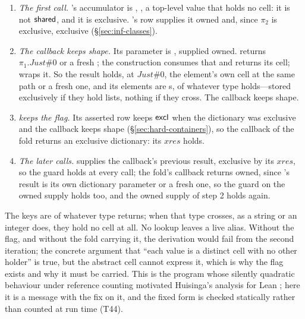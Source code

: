 \begin{enumerate}
\item \emph{The first call.} 's accumulator is , , a top-level value that holds no cell: it is not $\mathsf{shared}$, and it is exclusive.
's row supplies it owned and, since $\pi_2$ is exclusive, exclusive (\S\ref{sec:inf-classes}).
\item \emph{The callback keeps shape.} Its parameter is , supplied owned.
 returns $\pi_1.\mathit{Just}\#0$ or a fresh \code{[]}; the construction
\code{[ …⋯, x ]} consumes that and returns its cell;  wraps it. So the result holds, at
$\mathit{Just}\#0$, the element's own cell at the same path or a fresh one, and its elements are s, of
whatever type  holds---stored exclusively if they hold lists, nothing if they cross. The callback
keeps shape.
\item \emph{ keeps the flag.} Its asserted row keeps $\mathsf{excl}$ when the dictionary was
exclusive and the callback keeps shape (\S\ref{sec:hard-containers}), so the callback of the fold returns an
exclusive dictionary: its $\mathit{xres}$ holds.
\item \emph{The later calls.}  supplies the callback's previous result, exclusive by its
$\mathit{xres}$, so the guard  holds at every call; the fold's callback returns owned, since 's result is its own dictionary parameter or a fresh one, so the guard on the owned supply holds too, and the owned
supply of step 2 holds again.
\end{enumerate}
The keys are of whatever type  returns; when that type crosses, as a string or an integer does,
they hold no cell at all. No lookup leaves a live alias. Without the flag, and without the fold carrying it,
the derivation would fail from the second iteration; the
concrete argument that ``each value is a distinct cell with no other holder'' is true, but the abstract cell
cannot express it, which is why the flag exists and why it must be carried. This is the program whose
silently quadratic behaviour under reference counting motivated Huisinga's analysis for Lean
\citep{huisinga2023lean}; here it is a message with the fix on it, and the fixed form is checked statically
rather than counted at run time (T44).
